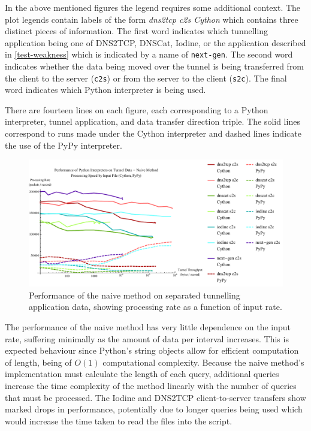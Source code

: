 \documentclass[12pt]{report}
\theoremstyle{remark}
\theoremstyle{definition}
\theoremstyle{definition}
\theoremstyle{definition}
\begin{document}
In the above mentioned figures the legend requires some additional context. The
plot legends contain labels of the form \emph{dns2tcp c2s Cython} which contains
three distinct pieces of information. The first word indicates which tunnelling
application being one of DNS2TCP, DNSCat, Iodine, or the application described
in \ref{test-weakness} which is indicated by a name of \texttt{next-gen}. The
second word indicates whether the data being moved over the tunnel is being
transferred from the client to the server (\texttt{c2s}) or from the server to
the client (\texttt{s2c}). The final word indicates which Python interpreter is
being used.

There are fourteen lines on each figure, each corresponding to a Python
interpreter, tunnel application, and data transfer direction triple. The solid
lines correspond to runs made under the Cython interpreter and dashed lines
indicate the use of the PyPy interpreter.

\begin{figure}
\centering
\includegraphics[width=\textwidth]{figures/ppia-naive.pdf}
\caption[Performance of Naive Method on Tunnel Data by Python
Interpreter]{Performance of the naive method on separated tunnelling application
data, showing processing rate as a function of input rate.}
\label{ppia-naive}
\end{figure}

The performance of the naive method has very little dependence on the input
rate, suffering minimally as the amount of data per interval increases. This is
expected behaviour since Python's string objects allow for efficient computation of
length, being of $O(1)$ computational complexity\cite{python-strlencplx}.
Because the naive method's implementation must calculate the length of each
query, additional queries increase the time complexity of the method linearly
with the number of queries that must be processed. The Iodine and DNS2TCP
client-to-server transfers show marked drops in performance, potentially due to
longer queries being used which would increase the time taken to read the files
into the script.
\end{document}
